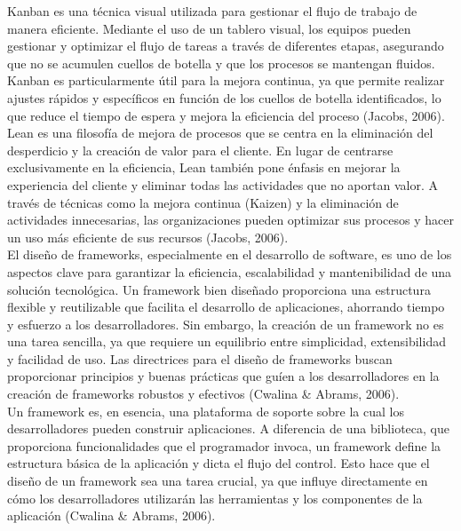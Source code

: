 \documentclass[12pt,letterpaper,spanish, xcolor=table]{report}
\numberwithin{figure}{subsection}
\begin{document}
Kanban es una técnica visual utilizada para gestionar el flujo de trabajo de manera eficiente. Mediante el uso de un tablero visual, los equipos pueden gestionar y optimizar el flujo de tareas a través de diferentes etapas, asegurando que no se acumulen cuellos de botella y que los procesos se mantengan fluidos. Kanban es particularmente útil para la mejora continua, ya que permite realizar ajustes rápidos y específicos en función de los cuellos de botella identificados, lo que reduce el tiempo de espera y mejora la eficiencia del proceso (Jacobs, 2006).\\

Lean es una filosofía de mejora de procesos que se centra en la eliminación del desperdicio y la creación de valor para el cliente. En lugar de centrarse exclusivamente en la eficiencia, Lean también pone énfasis en mejorar la experiencia del cliente y eliminar todas las actividades que no aportan valor. A través de técnicas como la mejora continua (Kaizen) y la eliminación de actividades innecesarias, las organizaciones pueden optimizar 
sus procesos y hacer un uso más eficiente de sus recursos (Jacobs, 2006).\\

El diseño de frameworks, especialmente en el desarrollo de software, es uno de los aspectos clave para garantizar la eficiencia, escalabilidad y mantenibilidad de una solución tecnológica. Un framework bien diseñado proporciona una estructura flexible y reutilizable que facilita el desarrollo de aplicaciones, ahorrando tiempo y esfuerzo a los desarrolladores. Sin embargo, la creación de un framework no es una tarea sencilla, ya que requiere un equilibrio entre simplicidad, extensibilidad y facilidad de uso. Las directrices para el diseño de frameworks buscan proporcionar principios y buenas prácticas que guíen a los desarrolladores en la creación de frameworks robustos y efectivos (Cwalina \& Abrams, 2006).\\

Un framework es, en esencia, una plataforma de soporte sobre la cual los desarrolladores pueden construir aplicaciones. A diferencia de una biblioteca, que proporciona funcionalidades que el programador invoca, un framework define la estructura básica de la aplicación y dicta el flujo del control. Esto hace que el diseño de un framework sea una tarea crucial, ya que influye directamente en cómo los desarrolladores utilizarán las herramientas y los componentes de la aplicación (Cwalina \& Abrams, 2006).\\
\end{document}
